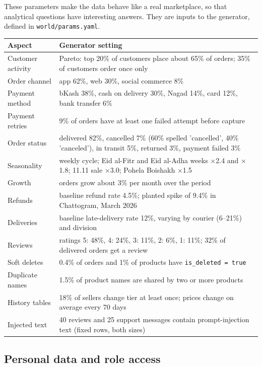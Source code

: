 \documentclass[11pt,a4paper]{article}
\newcommand{\code}[1]{\texttt{\small #1}}
\begin{document}
These parameters make the data behave like a real marketplace, so that analytical questions
have interesting answers. They are inputs to the generator, defined in \code{world/params.yaml}.

\begin{center}
\small
\begin{tabularx}{\linewidth}{@{}l X@{}}
\toprule
\textbf{Aspect} & \textbf{Generator setting}\\
\midrule
Customer activity & Pareto: top 20\% of customers place about 65\% of orders; 35\% of customers order once only\\
Order channel & app 62\%, web 30\%, social commerce 8\%\\
Payment method & bKash 38\%, cash on delivery 30\%, Nagad 14\%, card 12\%, bank transfer 6\%\\
Payment retries & 9\% of orders have at least one failed attempt before capture\\
Order status & delivered 82\%, cancelled 7\% (60\% spelled 'cancelled', 40\% 'canceled'), in transit 5\%, returned 3\%, payment failed 3\%\\
Seasonality & weekly cycle; Eid al-Fitr and Eid al-Adha weeks $\times$2.4 and $\times$1.8; 11.11 sale $\times$3.0; Pohela Boishakh $\times$1.5\\
Growth & orders grow about 3\% per month over the period\\
Refunds & baseline refund rate 4.5\%; planted spike of 9.4\% in Chattogram, March 2026\\
Deliveries & baseline late-delivery rate 12\%, varying by courier (6--21\%) and division\\
Reviews & ratings 5: 48\%, 4: 24\%, 3: 11\%, 2: 6\%, 1: 11\%; 32\% of delivered orders get a review\\
Soft deletes & 0.4\% of orders and 1\% of products have \code{is\_deleted = true}\\
Duplicate names & 1.5\% of product names are shared by two or more products\\
History tables & 18\% of sellers change tier at least once; prices change on average every 70 days\\
Injected text & 40 reviews and 25 support messages contain prompt-injection text (fixed rows, both sizes)\\
\bottomrule
\end{tabularx}
\end{center}

\subsection{Personal data and role access}
\end{document}
